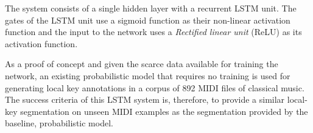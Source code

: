 The system consists of a single hidden layer with a
recurrent LSTM unit. The gates of the LSTM unit use a
sigmoid function as their non-linear activation function and
the input to the network uses a \emph{Rectified linear unit}
(ReLU) as its activation function.

As a proof of concept and given the scarce data available
for training the network, an existing probabilistic model
that requires no training
\parencite{napoleslopez2019keyfinding} is used for
generating local key annotations in a corpus of 892 MIDI
files of classical music. The success criteria of this LSTM
system is, therefore, to provide a similar local-key
segmentation on unseen MIDI examples as the segmentation
provided by the baseline, probabilistic model.
